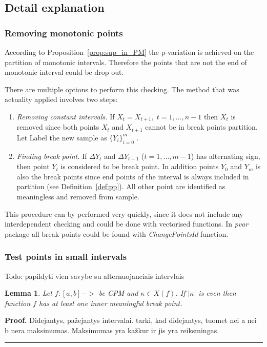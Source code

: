\documentclass[12pt, a4paper]{article}
\newtheorem{lemma}[theorem]{Lemma}
\newenvironment{proof}[1][Proof]{\noindent \textbf{#1.} }{\  \rule{0.5em}{0.5em}}
\numberwithin{equation}{section}
\begin{document}
\subsection{Detail explanation}

\subsubsection{Removing monotonic points}

According to Proposition~\ref{prop:sup_in_PM}
the p-variation is achieved 
on the partition of monotonic intervals. Therefore the points that are not the end of monotonic interval could be drop out. 

There are multiple options to perform this checking. The method
that was actuality applied involves two steps:

\begin{enumerate}
  \item \emph{Removing constant intervals.} 
  If  $X_{t}=X_{t+1},\;t=1,\dots,n-1$ then $X_t$ is removed
  since both points $X_{t}$ and $X_{t+1}$ cannot be in break points
  partition. Let Label the new sample as  $\{Y_{i}\}_{i=0}^{m}$ .
  
  \item \emph{Finding break point.}  
  If $\Delta Y_{t}$ and $\Delta Y_{t+1}$ ($t=1,\dots,m-1$)
  has alternating sign, then point $Y_t$ is considered 
  to be break point. In addition points $Y_0$ and $Y_m$ 
  is also the break points since end points of 
  the interval is always included in partition (see
  Definition~\ref{def:pp}). All other point are identified as
  meaningless and removed from sample.  

\end{enumerate}


This procedure can by performed very quickly, since it does not include
any interdependent checking and could be done with vectorised functions.
In \emph{pvar} package all break points could be found with \emph{ChangePointsId} function.



\subsubsection{Test points in small intervals}
Todo: papildyti vien savybe su alternuojanciais intervlais

\begin{lemma}\label{lm:evenkapa}
Let $f:[a,b] -> $ be CPM and $\kappa \in X(f)$. If $|\kappa|$ is even
then function $f$ has at least one inner meaningful break point.
\end{lemma}
\begin{proof}
Didejantys, pažejantys intervalai.
tarki, kad didejantys, tuomet nei a nei b nera maksimumas.
Maksimumas yra kažkur ir jis yra reiksmingas.
\end{proof}
\end{document}
